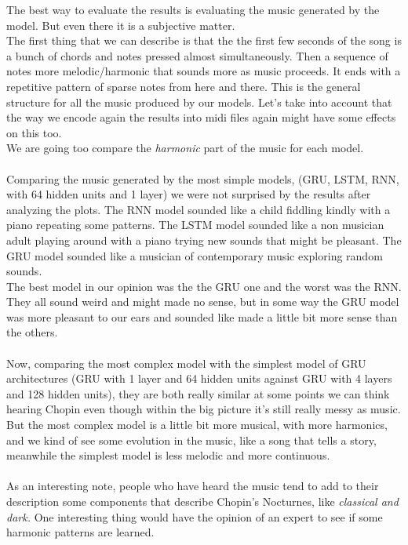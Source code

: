 \documentclass[11pt]
{article}
\begin{document}
The best way to evaluate the results is evaluating the music generated by the model. But even there it is a subjective matter. \\
The first thing that we can describe is that the the first few seconds of the song is a bunch of chords and notes pressed almost simultaneously.
Then a sequence of notes more melodic/harmonic that sounds more as music proceeds.
It ends with a repetitive pattern of sparse notes from here and there.
This is the general structure for all the music produced by our models.
Let's take into account that the way we encode again the results into midi files again might have some effects on this too.\\
We are going too compare the \textit{harmonic} part of the music for each model.\\
\\

Comparing the music generated by the most simple models, (GRU, LSTM, RNN, with 64 hidden units and 1 layer) we were not surprised by the results after analyzing the plots.
The RNN model sounded like a child fiddling kindly with a piano repeating some patterns.
The LSTM model sounded like a non musician adult playing around with a piano trying new sounds that might be pleasant.
The GRU model sounded like a musician of contemporary music exploring random sounds.\\
The best model in our opinion was the the GRU one and the worst was the RNN.
They all sound weird and might made no sense, but in some way the GRU model was more pleasant to our ears and sounded like made a little bit more sense than the others.\\
\\

Now, comparing the most complex model with the simplest model of GRU architectures (GRU with 1 layer and 64 hidden units against GRU with 4 layers and 128 hidden units), they are both really similar at some points we can think hearing Chopin even though within the big picture it's still really messy as music. 
But the most complex model is a little bit more musical, with more harmonics, and we kind of see some evolution in the music, like a song that tells a story, meanwhile the simplest model is less melodic and more continuous.\\
\\
As an interesting note, people who have heard the music tend to add to their description some components that describe Chopin's Nocturnes, like \textit{classical and dark.}
One interesting thing would have the opinion of an expert to see if some harmonic patterns are learned.\\
\end{document}
